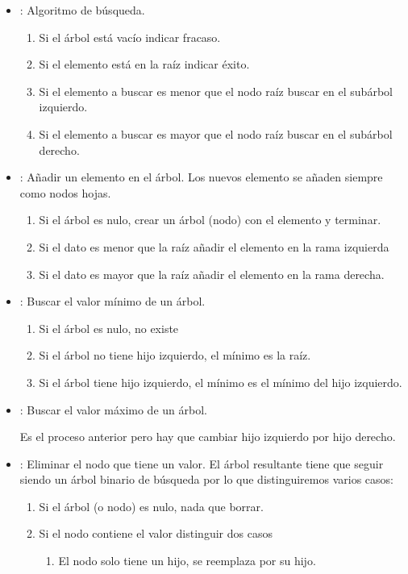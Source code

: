 \begin{itemize}
\item {}: Algoritmo de búsqueda.
	\begin{enumerate}
	\item Si el árbol está vacío indicar fracaso.
	\item Si el elemento está en la raíz indicar éxito.
	\item Si el elemento a buscar es menor que el nodo raíz buscar en el subárbol izquierdo.
	\item Si el elemento a buscar es mayor que el nodo raíz buscar en el subárbol derecho.
	\end{enumerate}

\item  {}: Añadir un elemento en el árbol. Los nuevos elemento se añaden siempre como nodos hojas. 
	\begin{enumerate}
	\item Si el árbol es nulo, crear un árbol (nodo) con el elemento y terminar.
	\item Si el dato es menor que la raíz añadir el elemento en la rama izquierda
	\item Si el dato es mayor que la raíz añadir el elemento en la rama derecha.
	\end{enumerate}
	
\item   {}: Buscar el valor mínimo de un árbol.
	\begin{enumerate}
	\item Si el árbol es nulo, no existe
	\item Si el árbol no tiene hijo izquierdo, el mínimo es la raíz.
	\item Si el árbol tiene hijo izquierdo, el mínimo es el mínimo del hijo izquierdo.
	\end{enumerate}
	
\item {}: Buscar el valor máximo de un árbol.
	
	Es el proceso anterior pero hay que cambiar hijo izquierdo por hijo derecho.
	
\item  {}: Eliminar el nodo que tiene un valor. El árbol resultante tiene que seguir siendo un árbol binario de búsqueda por lo que distinguiremos varios casos:
	\begin{enumerate}
	\item Si el árbol (o nodo) es nulo, nada que borrar.
	\item Si el nodo contiene el valor distinguir dos casos
		\begin{enumerate}
		\item El nodo solo tiene un hijo, se reemplaza por su hijo.
		

\end{enumerate}
\end{enumerate}
\end{itemize}
